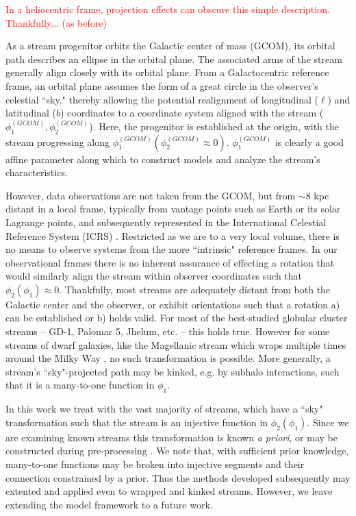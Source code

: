 \documentclass[twocolumn]{aastex631}
\newcommand{\stream}[1]{#1}
\newcommand{\smallcomponent}[2]{#2^{\scriptscriptstyle (#1)}}
\newcommand{\cmp}[2]{\smallcomponent{#1}{#2}}
\newcommand{\TODO}[1]{{\textcolor{red}{#1}}}
\newcommand{\JN}[1]{\TODO{#1}}
\begin{document}
        \JN{
        In a heliocentric frame, projection effects can obscure this simple description. Thankfully... (as before)}

        
        As a stream progenitor orbits the Galactic center of mass (GCOM), its
        orbital path describes an ellipse in the orbital plane. The associated
        arms of the stream generally align closely with its orbital plane.  From
        a Galactocentric reference frame, an orbital plane assumes the form of a
        great circle in the observer's celestial ``sky," thereby allowing the
        potential realignment of longitudinal ($\ell$) and latitudinal ($b$)
        coordinates to a coordinate system aligned with the stream
        ($\cmp{GCOM}{\phi_1}, \phi_2^{(GCOM)}$). Here, the progenitor is
        established at the origin, with the stream progressing along
        $\cmp{GCOM}{\phi_1} (\phi_2^{(GCOM)} \approx 0)$. $\cmp{GCOM}{\phi_1}$
        is clearly a good affine parameter along which to construct models and
        analyze the stream's characteristics.

        However, data observations are not taken from the GCOM, but from  $\sim
        8$ kpc distant \citep{GRAVITY2018, Leung+2022} in a local frame,
        typically from vantage points such as Earth or its solar Lagrange
        points, and subsequently represented in the International Celestial
        Reference System (ICRS) \citep{ICRS1997}.  Restricted as we are to a
        very local volume, there is no means to observe systems from the more
        ``intrinsic" reference frames. In our observational frames there is no
        inherent assurance of effecting a rotation that would similarly align
        the stream within observer coordinates such that $\phi_2(\phi_1) \approx
        0$.  Thankfully, most streams are adequately distant from both the
        Galactic center and the observer, or exhibit orientations such that a
        rotation a) can be established or b) holds valid. For most of the
        best-studied globular cluster streams -- \stream{GD-1}, \stream{Palomar
        5}, \stream{Jhelum}, etc. -- this holds true. However for some streams
        of dwarf galaxies, like the Magellanic stream which wraps multiple times
        around the Milky Way \citep{WannierWrixon1972}, no such transformation
        is possible. More generally, a stream's ``sky"-projected path may be
        kinked, e.g. by subhalo interactions, such that it is a many-to-one
        function in $\phi_1$.

        In this work we treat with the vast majority of streams, which have a
        ``sky" transformation such that the stream is an injective function in
        $\phi_2(\phi_1)$.  Since we are examining known streams this
        transformation is known \textit{a priori}, or may be constructed during
        pre-processing \citep[see][\S2.1]{Starkman+2023}.  We note that, with
        sufficient prior knowledge, many-to-one functions may be broken into
        injective segments and their connection constrained by a prior. Thus the
        methods developed subsequently may extented and applied even to wrapped
        and kinked streams. However, we leave extending the model framework to a
        future work.
\end{document}
